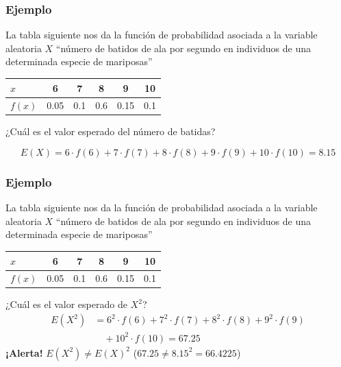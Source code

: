 \begin{frame}
\frametitle{Ejemplo}
La tabla siguiente nos da la función de probabilidad asociada a la variable aleatoria $X$ ``número de batidos de ala por segundo en individuos de una determinada especie de mariposas''
\begin{center}
\begin{tabular}{l|ccccc}
$x$ & 6 & 7 & 8 & 9 & 10\\
\hline
$f(x)$ &  0.05 & 0.1 & 0.6 & 0.15 & 0.1
\end{tabular}
\end{center}

¿Cuál es el valor esperado del número de batidas?
\medskip

$$
E(X)=6\cdot f(6)+7\cdot f(7)+8\cdot f(8)+9\cdot f(9)+10\cdot f(10)=8.15
$$
\end{frame}

\begin{frame}
\frametitle{Ejemplo}
La tabla siguiente nos da la función de probabilidad asociada a la variable aleatoria $X$ ``número de batidos de ala por segundo en individuos de una determinada especie de mariposas''
\begin{center}
\begin{tabular}{l|ccccc}
$x$ & 6 & 7 & 8 & 9 & 10\\
\hline
$f(x)$ &  0.05 & 0.1 & 0.6 & 0.15 & 0.1
\end{tabular}
\end{center}

¿Cuál es el  valor esperado de $X^2$?
$$
\begin{array}{rl}
E(X^2)  & = 6^2\cdot f(6)+7^2\cdot f(7)+8^2\cdot f(8) +9^2\cdot f(9)\\ & \quad+10^2\cdot f(10) =67.25
\end{array}
$$
\textbf{¡Alerta!} $E(X^2)\neq E(X)^2$ ($67.25\neq 8.15^2=66.4225$)
\end{frame}

